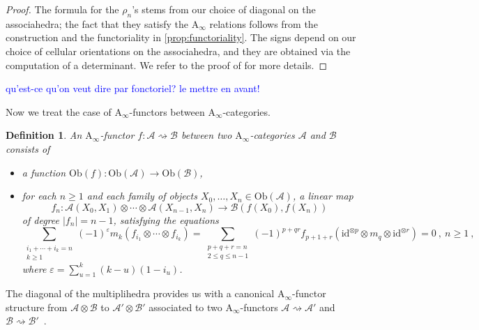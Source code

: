 \documentclass[twoside, 12pt]{amsart}
\newtheorem{definition}{Definition}[section]
\theoremstyle{remark}
\newcommand{\id}{\mathrm{id}}
\newcommand{\cat}[1]{\mathcal{#1}}
\newcommand{\Guillaume}[1]{\textcolor{blue}{#1}}
\begin{document}
\begin{proof}
  The formula for the $\rho_n$'s stems from our choice of diagonal on the associahedra; the fact that they satisfy the $\mathrm{A}_\infty$ relations follows from the construction and the functoriality in \cref{prop:functoriality}. The signs depend on our choice of cellular orientations on the associahedra, and they are obtained via the computation of a determinant. We refer to the proof of \cite[Proposition 4.27]{LA21} for more details. 
\end{proof}
\Guillaume{qu'est-ce qu'on veut dire par fonctoriel? le mettre en avant!}

Now we treat the case of $\mathrm{A}_\infty$-functors between $\mathrm{A}_\infty$-categories. 

\begin{definition}
An $\mathrm{A}_\infty$-functor $f : \cat{A} \rightsquigarrow \cat{B}$ between two $\mathrm{A}_\infty$-categories $\cat{A}$ and $\cat{B}$ consists of 
\begin{itemize}
\item a function $\mathrm{Ob}(f) : \mathrm{Ob}(\cat{A}) \to \mathrm{Ob}(\cat{B})$,
\item for each $n \geq 1$ and each family of objects $X_0, \ldots, X_n \in \mathrm{Ob}(\cat{A})$, a linear map \[f_n : \cat{A}(X_0,X_1) \otimes \cdots \otimes \cat{A}(X_{n-1},X_n) \to \cat{B}(f(X_0),f(X_n))\] of degree $|f_n|=n-1$, satisfying the equations \[
  \sum_{\substack{i_1+\cdots+i_k=n \\ k \geq 1}} (-1)^{\varepsilon} m_k(f_{i_1}\otimes\cdots\otimes f_{i_k}) = 
  \sum_{\substack{p+q+r=n \\ 2 \leq q \leq n-1}} (-1)^{p+qr}f_{p+1+r}(\id^{\otimes p} \otimes m_q \otimes \id^{\otimes r}) = 0 \ , \ n\geq 1 \ ,\] where $\varepsilon = \sum_{u=1}^{k}(k-u)(1-i_u)$.
\end{itemize}
\end{definition}

The diagonal of the multiplihedra provides us with a canonical $\mathrm{A}_\infty$-functor structure from $\cat{A}\otimes \cat{B}$ to $\cat{A}'\otimes \cat{B}'$ associated to two $\mathrm{A}_\infty$-functors $\cat{A}\rightsquigarrow \cat{A}'$ and $\cat{B} \rightsquigarrow \cat{B}'$~. 
\end{document}
